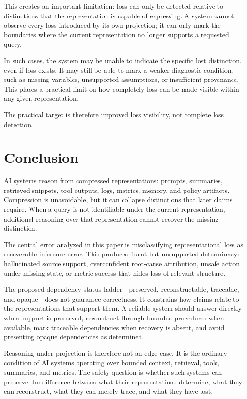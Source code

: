 \documentclass[11pt]{article}
\begin{document}
This creates an important limitation: loss can only be detected relative to distinctions that the representation is capable of expressing. A system cannot observe every loss introduced by its own projection; it can only mark the boundaries where the current representation no longer supports a requested query.

In such cases, the system may be unable to indicate the specific lost distinction, even if loss exists. It may still be able to mark a weaker diagnostic condition, such as missing variables, unsupported assumptions, or insufficient provenance. This places a practical limit on how completely loss can be made visible within any given representation.

The practical target is therefore improved loss visibility, not complete loss detection.

\section{Conclusion}

AI systems reason from compressed representations: prompts, summaries, retrieved snippets, tool outputs, logs, metrics, memory, and policy artifacts. Compression is unavoidable, but it can collapse distinctions that later claims require. When a query is not identifiable under the current representation, additional reasoning over that representation cannot recover the missing distinction.

The central error analyzed in this paper is misclassifying representational loss as recoverable inference error. This produces fluent but unsupported determinacy: hallucinated source support, overconfident root-cause attribution, unsafe action under missing state, or metric success that hides loss of relevant structure.

The proposed dependency-status ladder---preserved, reconstructable, traceable, and opaque---does not guarantee correctness. It constrains how claims relate to the representations that support them. A reliable system should answer directly when support is preserved, reconstruct through bounded procedures when available, mark traceable dependencies when recovery is absent, and avoid presenting opaque dependencies as determined.

Reasoning under projection is therefore not an edge case. It is the ordinary condition of AI systems operating over bounded context, retrieval, tools, summaries, and metrics. The safety question is whether such systems can preserve the difference between what their representations determine, what they can reconstruct, what they can merely trace, and what they have lost.
\end{document}
